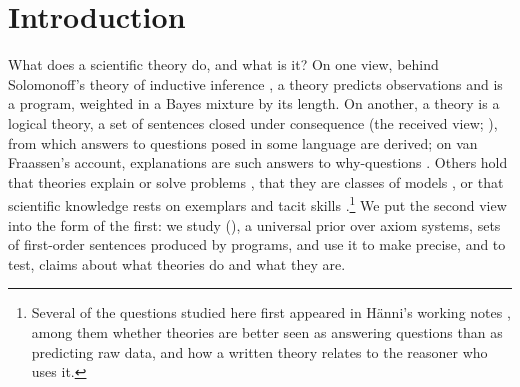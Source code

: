 \section{Introduction}\label{sec:intro}

What does a scientific theory do, and what is it? On one view, behind Solomonoff's theory of inductive inference \citep{solomonoff1964formal}, a theory predicts observations and is a program, weighted in a Bayes mixture by its length. On another, a theory is a logical theory, a set of sentences closed under consequence (the received view; \citealp{suppe1977structure}), from which answers to questions posed in some language are derived; on van Fraassen's account, explanations are such answers to why-questions \citep[ch.~5]{vanfraassen1980scientific}. Others hold that theories explain \citep{hempel1948studies} or solve problems \citep{laudan1977progress}, that they are classes of models \citep{suppes1960comparison}, or that scientific knowledge rests on exemplars and tacit skills \citep{kuhn1970structure,polanyi1958personal}.\footnote{Several of the questions studied here first appeared in H\"anni's working notes \citep{hanni2026notes}, among them whether theories are better seen as answering questions than as predicting raw data, and how a written theory relates to the reasoner who uses it.} We put the second view into the form of the first: we study \SAI (\SAIabbr), a universal prior over axiom systems, sets of first-order sentences produced by programs, and use it to make precise, and to test, claims about what theories do and what they are.

